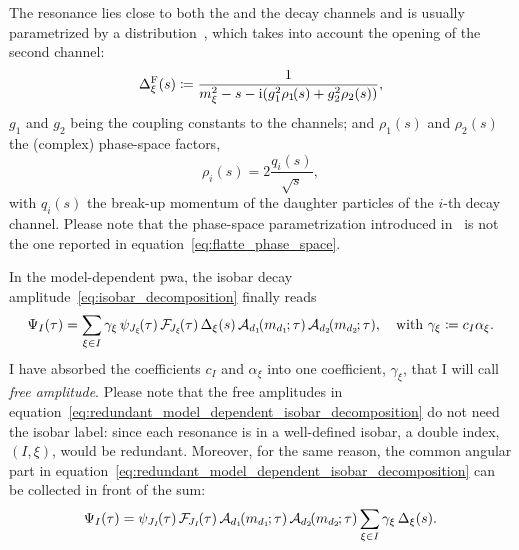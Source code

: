     
    The \Pfnez{} resonance lies close to both the \Ppiplus{}\Ppiminus{} and the \PKplus{}\PKminus{} decay channels and is usually parametrized by a \citeauthor{FLATTE1976224} distribution~\cite{FLATTE1976224}, which takes into account the opening of the second channel:
    \begin{equation}\label{eq:flatte}
        \Delta_{\xi}^{\text{F}}(s) \coloneqq \frac{1}{m_{\xi}^2 - s - \mathrm{i}(g_1^2 \rho_{1\!}(s)  + g_2^2 \rho_2(s))},
    \end{equation}
    $g_1$ and $g_2$ being the coupling constants to the channels;
    and $\rho_{1\!}(s)$ and $\rho_2(s)$ the (complex) phase-space factors,
    \begin{equation}\label{eq:flatte_phase_space}
        \rho_i(s) = 2\frac{q_i(s)}{\sqrt{s}},
    \end{equation}
    with $q_i(s)$ the break-up momentum of the daughter particles of the $i$-th decay channel.
    Please note that the phase-space parametrization \citeauthor{FLATTE1976224} introduced in~\cite{FLATTE1976224} is not the one reported in equation~\eqref{eq:flatte_phase_space}.

    In the model-dependent \ac{pwa}, the isobar decay amplitude~\eqref{eq:isobar_decomposition} finally reads
    \begin{equation}\label{eq:redundant_model_dependent_isobar_decomposition}
        \Psi_I(\tau) =  \sum_{\xi\in I} \gamma_\xi \,\psi_{J_\xi\!}(\tau)\,\mathcal{F\!}_{J_\xi\!}(\tau)\,\Delta_{\xi}(s)\,\mathcal{A}_{d_1}\!(m_{d_1\!}; \tau)\,\mathcal{A}_{d_2}\!(m_{d_2\!}; \tau),\quad
        \text{with }
        \gamma_\xi\coloneqq c_I \alpha_{\xi}.
    \end{equation}
    I have absorbed the coefficients $c_I$ and $\alpha_\xi$ into one coefficient, $\gamma_{\xi}$, that I will call \emph{free amplitude}.
    Please note that the free amplitudes in equation~\eqref{eq:redundant_model_dependent_isobar_decomposition} do not need the isobar label: since each resonance is in a well-defined isobar, a double index, $(I,\xi)$, would be redundant.
    Moreover, for the same reason, the common angular part in equation~\eqref{eq:redundant_model_dependent_isobar_decomposition} can be collected in front of the sum:
    \begin{equation}\label{eq:non_redundant_model_dependent_isobar_decomposition}
        \Psi_I(\tau) =  \psi_{J_I\!}(\tau)\,\mathcal{F\!}_{J_I\!}(\tau)\,\mathcal{A}_{d_1}\!(m_{d_1\!}; \tau)\,\mathcal{A}_{d_2}\!(m_{d_2\!}; \tau)\sum_{\xi\in I} \gamma_\xi \,\Delta_{\xi}(s).
    \end{equation}


